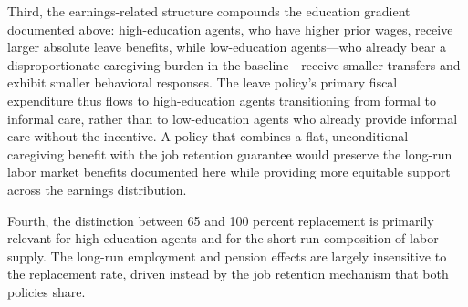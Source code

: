 Third, the earnings-related structure compounds the education gradient documented above: high-education agents, who have higher prior wages, receive larger absolute leave benefits, while low-education agents---who already bear a disproportionate caregiving burden in the baseline---receive smaller transfers and exhibit smaller behavioral responses. The leave policy's primary fiscal expenditure thus flows to high-education agents transitioning from formal to informal care, rather than to low-education agents who already provide informal care without the incentive. A policy that combines a flat, unconditional caregiving benefit with the job retention guarantee would preserve the long-run labor market benefits documented here while providing more equitable support across the earnings distribution.

Fourth, the distinction between 65 and 100 percent replacement is primarily relevant for high-education agents and for the short-run composition of labor supply. The long-run employment and pension effects are largely insensitive to the replacement rate, driven instead by the job retention mechanism that both policies share.

